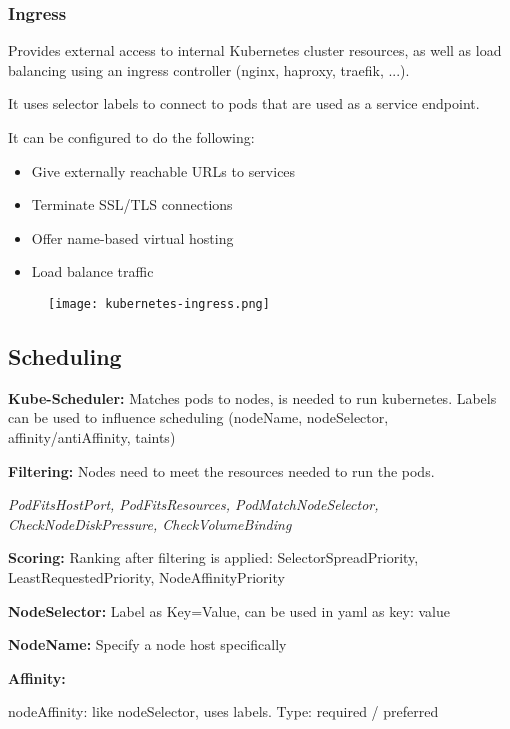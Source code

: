 \subsubsection{Ingress}
Provides external access to internal Kubernetes cluster resources, 
as well as load balancing using an ingress controller (nginx, haproxy, traefik, ...). 

It uses selector labels to connect to pods that are used as a service endpoint. 

It can be configured to do the following:

\begin{itemize}
    \item Give externally reachable URLs to services
    \item Terminate SSL/TLS connections
    \item Offer name-based virtual hosting
    \item Load balance traffic
\end{itemize}

\begin{figure}[h]
    \centering
    \texttt{[image: kubernetes-ingress.png]}
\end{figure}

\subsection{Scheduling}

\textbf{Kube-Scheduler:} Matches pods to nodes, is needed to run kubernetes. Labels can be used to influence scheduling (nodeName, nodeSelector, affinity/antiAffinity, taints)

\noindent
\textbf{Filtering:} Nodes need to meet the resources needed to run the pods. 

\emph{PodFitsHostPort, PodFitsResources, PodMatchNodeSelector, CheckNodeDiskPressure, CheckVolumeBinding}

\noindent
\textbf{Scoring:} Ranking after filtering is applied: SelectorSpreadPriority, LeastRequestedPriority, NodeAffinityPriority

\noindent
\textbf{NodeSelector:} Label as Key=Value, can be used in yaml as key: value

\noindent
\textbf{NodeName:} Specify a node host specifically

\noindent
\textbf{Affinity:}
 
nodeAffinity: like nodeSelector, uses labels. Type: required / preferred

